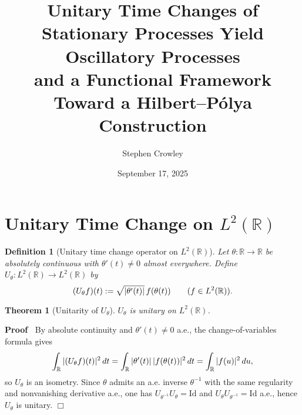 \documentclass{article}
\newcommand{\assign}{:=}
\newenvironment{proof}{\noindent\textbf{Proof\ }}{\hspace*{\fill}$\Box$\medskip}
\newtheorem{definition}{Definition}
\newtheorem{theorem}{Theorem}
\begin{document}
\title{
  Unitary Time Changes of Stationary Processes Yield Oscillatory Processes\\
  and a Functional Framework Toward a Hilbert--P{\'o}lya Construction
}

\author{Stephen Crowley}

\date{September 17, 2025}

\maketitle

{\tableofcontents}

\section{Unitary Time Change on $L^2 (\mathbb{R})$}

\begin{definition}
  [Unitary time change operator on $L^2 (\mathbb{R})$] Let $\theta :
  \mathbb{R} \to \mathbb{R}$ be absolutely continuous with $\theta' (t) \neq
  0$ almost everywhere. Define $U_{\theta} : L^2 (\mathbb{R}) \to L^2
  (\mathbb{R})$ by
  \begin{equation}
    (U_{\theta} f) (t) \assign \sqrt{| \theta' (t) |}  \hspace{0.17em} f
    (\theta (t))  \qquad (f \in L^2 (\mathbb{R})) .
  \end{equation}
\end{definition}

\begin{theorem}
  [Unitarity of $U_{\theta}$] $U_{\theta}$ is unitary on $L^2 (\mathbb{R})$.
\end{theorem}

\begin{proof}
  By absolute continuity and $\theta' (t) \neq 0$ a.e., the
  change-of-variables formula gives
  \[ \int_{\mathbb{R}} | (U_{\theta} f) (t) |^2 \hspace{0.17em} dt =
     \int_{\mathbb{R}} | \theta' (t) | \hspace{0.17em} |f (\theta (t)) |^2
     \hspace{0.17em} dt = \int_{\mathbb{R}} |f (u) |^2  \hspace{0.17em} du, \]
  so $U_{\theta}$ is an isometry. Since $\theta$ admits an a.e. inverse
  $\theta^{- 1}$ with the same regularity and nonvanishing derivative a.e.,
  one has $U_{\theta^{- 1}} U_{\theta} = \mathrm{Id}$ and $U_{\theta}
  U_{\theta^{- 1}} = \mathrm{Id}$ a.e., hence $U_{\theta}$ is unitary.
\end{proof}
\end{document}
